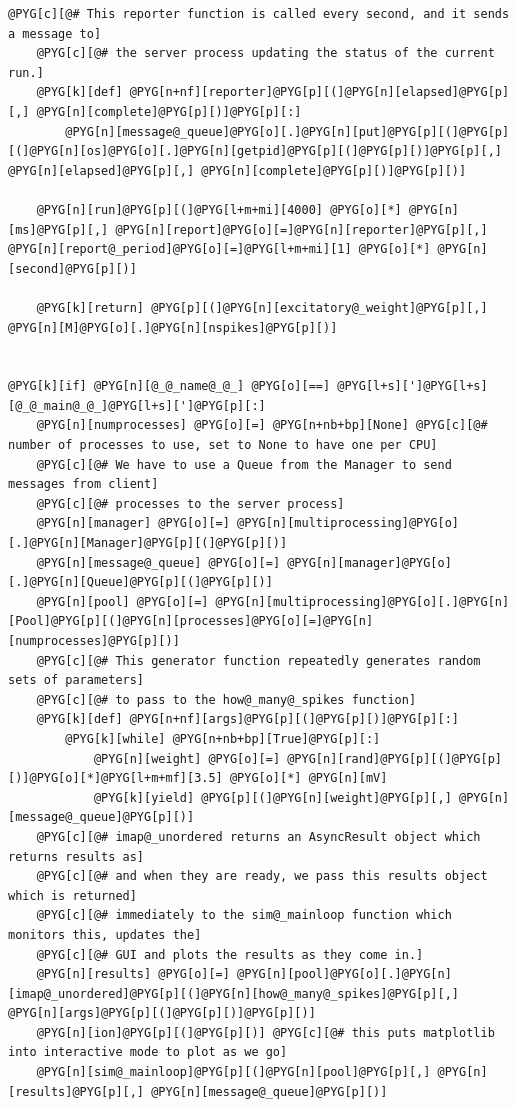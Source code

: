 \documentclass[letterpaper,10pt,english]{manual}
\begin{document}
\begin{Verbatim}[commandchars=@\[\]]
    @PYG[c][@# This reporter function is called every second, and it sends a message to]
    @PYG[c][@# the server process updating the status of the current run.]
    @PYG[k][def] @PYG[n+nf][reporter]@PYG[p][(]@PYG[n][elapsed]@PYG[p][,] @PYG[n][complete]@PYG[p][)]@PYG[p][:]
        @PYG[n][message@_queue]@PYG[o][.]@PYG[n][put]@PYG[p][(]@PYG[p][(]@PYG[n][os]@PYG[o][.]@PYG[n][getpid]@PYG[p][(]@PYG[p][)]@PYG[p][,] @PYG[n][elapsed]@PYG[p][,] @PYG[n][complete]@PYG[p][)]@PYG[p][)]

    @PYG[n][run]@PYG[p][(]@PYG[l+m+mi][4000] @PYG[o][*] @PYG[n][ms]@PYG[p][,] @PYG[n][report]@PYG[o][=]@PYG[n][reporter]@PYG[p][,] @PYG[n][report@_period]@PYG[o][=]@PYG[l+m+mi][1] @PYG[o][*] @PYG[n][second]@PYG[p][)]

    @PYG[k][return] @PYG[p][(]@PYG[n][excitatory@_weight]@PYG[p][,] @PYG[n][M]@PYG[o][.]@PYG[n][nspikes]@PYG[p][)]


@PYG[k][if] @PYG[n][@_@_name@_@_] @PYG[o][==] @PYG[l+s][']@PYG[l+s][@_@_main@_@_]@PYG[l+s][']@PYG[p][:]
    @PYG[n][numprocesses] @PYG[o][=] @PYG[n+nb+bp][None] @PYG[c][@# number of processes to use, set to None to have one per CPU]
    @PYG[c][@# We have to use a Queue from the Manager to send messages from client]
    @PYG[c][@# processes to the server process]
    @PYG[n][manager] @PYG[o][=] @PYG[n][multiprocessing]@PYG[o][.]@PYG[n][Manager]@PYG[p][(]@PYG[p][)]
    @PYG[n][message@_queue] @PYG[o][=] @PYG[n][manager]@PYG[o][.]@PYG[n][Queue]@PYG[p][(]@PYG[p][)]
    @PYG[n][pool] @PYG[o][=] @PYG[n][multiprocessing]@PYG[o][.]@PYG[n][Pool]@PYG[p][(]@PYG[n][processes]@PYG[o][=]@PYG[n][numprocesses]@PYG[p][)]
    @PYG[c][@# This generator function repeatedly generates random sets of parameters]
    @PYG[c][@# to pass to the how@_many@_spikes function]
    @PYG[k][def] @PYG[n+nf][args]@PYG[p][(]@PYG[p][)]@PYG[p][:]
        @PYG[k][while] @PYG[n+nb+bp][True]@PYG[p][:]
            @PYG[n][weight] @PYG[o][=] @PYG[n][rand]@PYG[p][(]@PYG[p][)]@PYG[o][*]@PYG[l+m+mf][3.5] @PYG[o][*] @PYG[n][mV]
            @PYG[k][yield] @PYG[p][(]@PYG[n][weight]@PYG[p][,] @PYG[n][message@_queue]@PYG[p][)]
    @PYG[c][@# imap@_unordered returns an AsyncResult object which returns results as]
    @PYG[c][@# and when they are ready, we pass this results object which is returned]
    @PYG[c][@# immediately to the sim@_mainloop function which monitors this, updates the]
    @PYG[c][@# GUI and plots the results as they come in.]
    @PYG[n][results] @PYG[o][=] @PYG[n][pool]@PYG[o][.]@PYG[n][imap@_unordered]@PYG[p][(]@PYG[n][how@_many@_spikes]@PYG[p][,] @PYG[n][args]@PYG[p][(]@PYG[p][)]@PYG[p][)]
    @PYG[n][ion]@PYG[p][(]@PYG[p][)] @PYG[c][@# this puts matplotlib into interactive mode to plot as we go]
    @PYG[n][sim@_mainloop]@PYG[p][(]@PYG[n][pool]@PYG[p][,] @PYG[n][results]@PYG[p][,] @PYG[n][message@_queue]@PYG[p][)]
\end{Verbatim}
\end{document}
